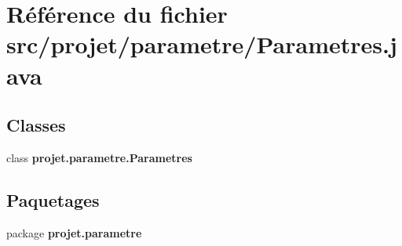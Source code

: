 \section{\-Référence du fichier src/projet/parametre/\-Parametres.java}
\label{_parametres_8java}
\subsection*{\-Classes}
\begin{DoxyCompactItemize}
\item 
class {\bf projet.\-parametre.\-Parametres}
\end{DoxyCompactItemize}
\subsection*{\-Paquetages}
\begin{DoxyCompactItemize}
\item 
package {\bf projet.\-parametre}
\end{DoxyCompactItemize}
